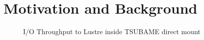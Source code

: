 \documentclass[JIP,draft]{ipsj}
\begin{document}
\section{Motivation and Background}


\begin{figure}[tb]
	\centering
	\caption{I/O Throughput to Lustre inside TSUBAME direct mount}
	\label{throughput TSUBAME}
\end{figure}
\end{document}
